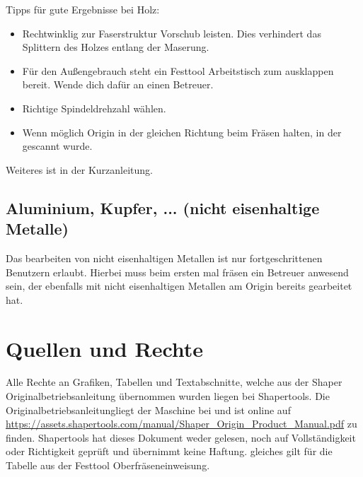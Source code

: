 \documentclass{\basedir/fablab-document}
\begin{document}
Tipps für gute Ergebnisse bei Holz:
\begin{itemize}
    \item Rechtwinklig zur Faserstruktur Vorschub leisten. Dies verhindert das Splittern des Holzes entlang der Maserung.
    \item Für den Außengebrauch steht ein Festtool Arbeitstisch zum ausklappen bereit. Wende dich dafür an einen Betreuer.
    \item Richtige Spindeldrehzahl wählen.
    \item Wenn möglich Origin in der gleichen Richtung beim Fräsen halten, in der gescannt wurde.
\end{itemize}

Weiteres ist in der Kurzanleitung.

\subsection{Aluminium, Kupfer, ... (nicht eisenhaltige Metalle)}
Das bearbeiten von nicht eisenhaltigen Metallen ist nur fortgeschrittenen Benutzern erlaubt. Hierbei muss beim ersten mal fräsen ein Betreuer anwesend sein, der ebenfalls mit nicht eisenhaltigen Metallen am Origin bereits gearbeitet hat.

\section{Quellen und Rechte}
\label{quellen}
Alle Rechte an Grafiken, Tabellen und Textabschnitte, welche aus der Shaper Originalbetriebsanleitung übernommen wurden liegen bei Shapertools. Die \glqq Originalbetriebsanleitung\grqq liegt der Maschine bei und ist online auf \url{https://assets.shapertools.com/manual/Shaper_Origin_Product_Manual.pdf} zu finden. Shapertools hat dieses Dokument weder gelesen, noch auf Vollständigkeit oder Richtigkeit geprüft und übernimmt keine Haftung. gleiches gilt für die Tabelle aus der Festtool Oberfräseneinweisung.
\end{document}
